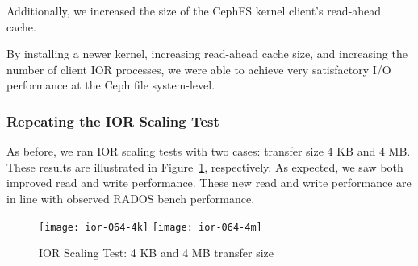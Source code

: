 


Additionally, we increased the size of the CephFS kernel client's read-ahead
cache.  

\begin{comment}
\begin{figure}[htb]
\centering
\texttt{[image: ior\_kernel\_change]}
\caption{CephFS performance with kernel changes to 3.9, IOR with 4 MB transfer
size}
\label{fig:ior-kernel-39}
\end{figure}
\end{comment}

By installing a newer kernel, increasing read-ahead cache size, and increasing
the number of client IOR processes, we were able to achieve very satisfactory
I/O performance at the Ceph file system-level.


\subsubsection{Repeating the IOR Scaling Test}

As before, we ran IOR scaling tests with two cases: transfer size 4 KB and 4
MB.  These results are illustrated in Figure~\ref{fig:ior-064}, respectively.
As expected, we saw both improved read and write performance. These new read
and write performance are in line with observed RADOS bench performance.


\begin{figure}[htb]
\centering
\texttt{[image: ior-064-4k]}
\texttt{[image: ior-064-4m]}
\caption{IOR Scaling Test: 4 KB and 4 MB transfer size}
\label{fig:ior-064}
\end{figure}


